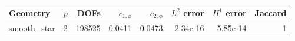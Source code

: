 \begin{tabular}{llrrrrrr}
\toprule
Geometry & $p$ & DOFs & $c_{1,\phi}$ & $c_{2,\phi}$ & $L^2$ error & $H^1$ error & Jaccard\\
\midrule
smooth\_star & 2 & 198525 & 0.0411 & 0.0473 & 2.34e-16 & 5.85e-14 & 1\\
\bottomrule
\end{tabular}
